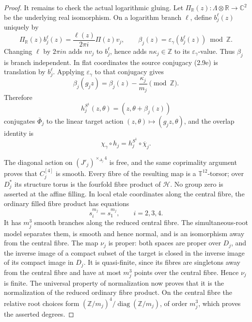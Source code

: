 \begin{proof}
It remains to check the actual logarithmic gluing.  Let
\(\Pi_{\mathbb R}(z):\Lambda\otimes\mathbb R\to\mathbb C^2\) be the
underlying real isomorphism.  On a logarithm branch \(\ell\), define
\(b_j^\ell(z)\) uniquely by
\begin{equation}
 \Pi_{\mathbb R}(z)b_j^\ell(z)
 =\frac{\ell(z)}{2\pi i}\Pi(z)v_j,\qquad
 \beta_j(z)=\varepsilon_\gamma(b_j^\ell(z))\bmod\mathbb Z.
 \label{cusp-spec-finite-target-conjugacy}
\end{equation}
Changing \(\ell\) by \(2\pi in\) adds \(nv_j\) to \(b_j^\ell\), hence
adds \(n\kappa_j\in\mathbb Z\) to its
\(\varepsilon_\gamma\)-value.  Thus \(\beta_j\) is branch independent.
In flat coordinates the source conjugacy (2.9e) is translation by
\(b_j^\ell\).  Applying \(\varepsilon_\gamma\) to that conjugacy gives
\begin{equation}
 \beta_j(g_jz)=\beta_j(z)-\frac{\kappa_j}{m_j}\pmod{\mathbb Z}.
 \label{cusp-spec-finite-target-cocycle}
\end{equation}
Therefore
\[
 h_j^{S^1}(z,\theta)=(z,\theta+\beta_j(z))
\]
conjugates \(\overline\Phi_j\) to the linear target action
\((z,\theta)\mapsto(g_jz,\theta)\), and the overlap identity is
\begin{equation}
 \chi_\gamma\circ h_j=h_j^{S^1}\circ\overline\chi_j.
 \label{cusp-spec-finite-overlap-identity}
\end{equation}

The diagonal action on
\((J'_j)^{\times_{\Delta_j}4}\) is free, and the same coprimality argument
proves that \(C_j^{[4]}\) is smooth.  Every fibre of the resulting map is
a \(\mathbb T^{12}\)-torsor; over \(D_j^*\) its structure torus is the
fourfold fibre product of \(\mathcal H\).  No group zero is asserted at
the affine filling.
In local etale coordinates along the central fibre, the ordinary filled
fibre product has equations
\begin{equation}
 s_i^{m_j}=s_1^{m_j},\qquad i=2,3,4.
 \label{cusp-spec-finite-fibre-product-branches}
\end{equation}
It has \(m_j^3\) smooth branches along the reduced central fibre.  The
simultaneous-root model separates them, is smooth and hence normal, and is
an isomorphism away from the central fibre.  The map \(\nu_j\) is proper:
both spaces are proper over \(D_j\), and the inverse image of a compact
subset of the target is closed in the inverse image of its compact image
in \(D_j\).  It is quasi-finite, since its fibres are singletons away from
the central fibre and have at most \(m_j^3\) points over the central
fibre.  Hence \(\nu_j\) is finite.  The universal property of
normalization now proves that it is the normalization of the reduced
ordinary fibre product.  On the central fibre the relative root choices form
\((\mathbb Z/m_j)^4/\operatorname{diag}(\mathbb Z/m_j)\), of order
\(m_j^3\), which proves the asserted degrees.


\end{proof}
